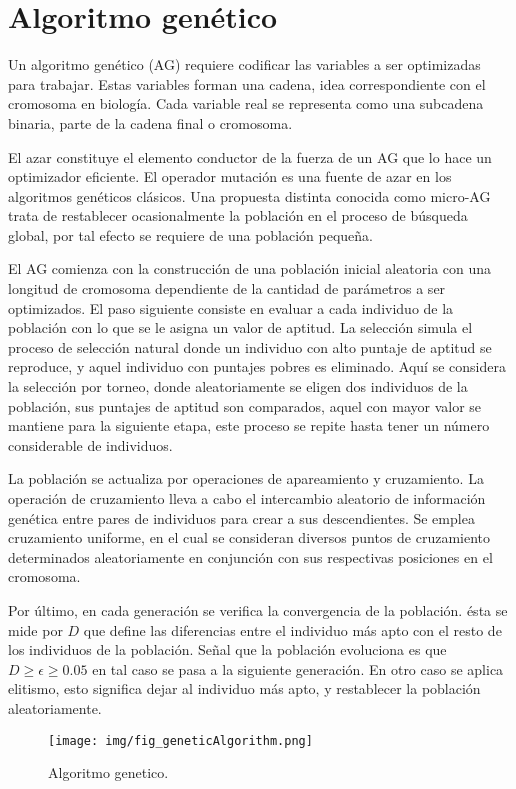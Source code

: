\section{Algoritmo gen\'etico}

Un algoritmo gen\'etico (AG) requiere codificar las variables a
ser optimizadas para trabajar. Estas variables forman
una cadena, idea correspondiente con el cromosoma en biolog\'ia.
Cada variable real se representa como una subcadena
binaria, parte de la cadena final o cromosoma.

El azar constituye el elemento conductor de la fuerza de
un AG que lo hace un optimizador eficiente. El operador mutaci\'on
es una fuente de azar en los algoritmos gen\'eticos cl\'asicos.
Una propuesta distinta conocida como micro-AG trata
de restablecer ocasionalmente la poblaci\'on en el proceso de
b\'usqueda global, por tal efecto se requiere de una poblaci\'on
peque\~na.

El AG comienza con la construcci\'on de una poblaci\'on
inicial aleatoria con una longitud de cromosoma dependiente
de la cantidad de par\'ametros a ser optimizados. El paso
siguiente consiste en evaluar a cada individuo de la poblaci\'on
con lo que se le asigna un valor de aptitud. La selecci\'on simula
el proceso de selecci\'on natural donde un individuo con alto
puntaje de aptitud se reproduce, y aquel individuo con puntajes
pobres es eliminado. Aqu\'i se considera la selecci\'on por
torneo, donde aleatoriamente se eligen dos individuos de la
poblaci\'on, sus puntajes de aptitud son comparados, aquel con
mayor valor se mantiene para la siguiente etapa, este proceso
se repite hasta tener un n\'umero considerable de individuos.

La poblaci\'on se actualiza por operaciones de apareamiento
y cruzamiento. La operaci\'on de cruzamiento lleva a cabo
el intercambio aleatorio de informaci\'on gen\'etica entre pares
de individuos para crear a sus descendientes. Se emplea cruzamiento
uniforme, en el cual se consideran diversos puntos
de cruzamiento determinados aleatoriamente en conjunci\'on
con sus respectivas posiciones en el cromosoma.

Por \'ultimo, en cada generaci\'on se verifica la convergencia
de la poblaci\'on. \'esta se mide por $D$ que define las diferencias
entre el individuo m\'as apto con el resto de los individuos
de la poblaci\'on. Se\~nal que la poblaci\'on evoluciona es que
$D\geq\epsilon\geq0.05$ en tal caso se pasa a la siguiente generaci\'on.
En otro caso se aplica elitismo, esto significa dejar al individuo
m\'as apto, y restablecer la poblaci\'on aleatoriamente.

\begin{figure}[H]
	\centering
	\texttt{[image: img/fig\_geneticAlgorithm.png]}
	\caption{Algoritmo genetico.}
	\label{fig:geneticAlgorithm}
\end{figure}
